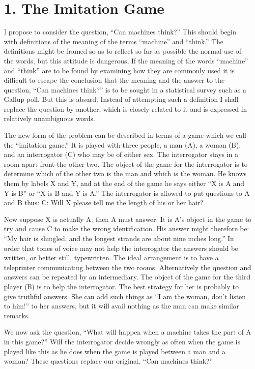 \documentclass[10pt,twoside,openright]{memoir}
\begin{document}
\section{1. The Imitation Game}

I propose to consider the question, ``Can machines think?'' This should begin with definitions of the meaning of the terms ``machine'' and ``think.'' The definitions might be framed so as to reflect so far as possible the normal use of the words, but this attitude is dangerous, If the meaning of the words ``machine'' and ``think'' are to be found by examining how they are commonly used it is difficult to escape the conclusion that the meaning and the answer to the question, ``Can machines think?'' is to be sought in a statistical survey such as a Gallup poll. But this is absurd. Instead of attempting such a definition I shall replace the question by another, which is closely related to it and is expressed in relatively unambiguous words.

The new form of the problem can be described in terms of a game which we call the ``imitation game.'' It is played with three people, a man (A), a woman (B), and an interrogator (C) who may be of either sex. The interrogator stays in a room apart front the other two. The object of the game for the interrogator is to determine which of the other two is the man and which is the woman. He knows them by labels X and Y, and at the end of the game he says either ``X is A and Y is B'' or ``X is B and Y is A.'' The interrogator is allowed to put questions to A and B thus:
C: Will X please tell me the length of his or her hair?

Now suppose X is actually A, then A must answer. It is A's object in the game to try and cause C to make the wrong identification. His answer might therefore be:
``My hair is shingled, and the longest strands are about nine inches long.''
In order that tones of voice may not help the interrogator the answers should be written, or better still, typewritten. The ideal arrangement is to have a teleprinter communicating between the two rooms. Alternatively the question and answers can be repeated by an intermediary. The object of the game for the third player (B) is to help the interrogator. The best strategy for her is probably to give truthful answers. She can add such things as ``I am the woman, don't listen to him!'' to her answers, but it will avail nothing as the man can make similar remarks.

We now ask the question, ``What will happen when a machine takes the part of A in this game?'' Will the interrogator decide wrongly as often when the game is played like this as he does when the game is played between a man and a woman? These questions replace our original, ``Can machines think?''
         
\end{document}
